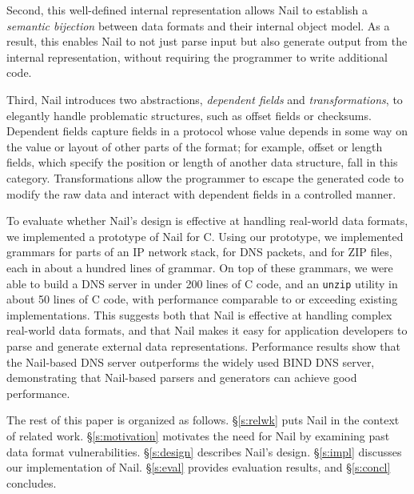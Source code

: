 Second, this well-defined internal representation allows Nail to
establish a {\em semantic bijection} between data formats and their
internal object model.  As a result, this enables Nail to not just
parse input but also generate output from the internal representation,
without requiring the programmer to write additional code.




Third, Nail introduces two abstractions, \emph{dependent fields} and
\emph{transformations}, to elegantly handle problematic structures,
such as offset fields or checksums.  Dependent fields capture fields
in a protocol whose value depends in some way on the value or layout
of other parts of the format; for example, offset or length fields,
which specify the position or length of another data structure, fall
in this category.  Transformations allow the programmer to escape the
generated code to modify the raw data and interact with dependent fields
in a controlled manner.

To evaluate whether Nail's design is effective at handling real-world data
formats, we implemented a prototype of Nail for C\@. Using our prototype, we
implemented grammars for parts of an IP network stack, for DNS packets,
and for ZIP files, each in about a hundred lines of grammar. On top of these
grammars, we were able to build a DNS server in under 200 lines of C code, and
an {\tt unzip} utility in about 50 lines of C code, with performance comparable
to or exceeding existing implementations. This suggests both that Nail is
effective at handling complex real-world data formats, and that Nail makes it
easy for application developers to parse and generate external data
representations. Performance results show that the Nail-based DNS server
outperforms the widely used BIND DNS server, demonstrating that Nail-based
parsers and generators can achieve good performance.

The rest of this paper is organized as follows.  \S\ref{s:relwk}
puts Nail in the context of related work.
\S\ref{s:motivation} motivates the need for Nail by examining
past data format vulnerabilities.
\S\ref{s:design} describes
Nail's design.  \S\ref{s:impl} discusses our implementation
of Nail.  \S\ref{s:eval} provides evaluation results, and
\S\ref{s:concl} concludes.

